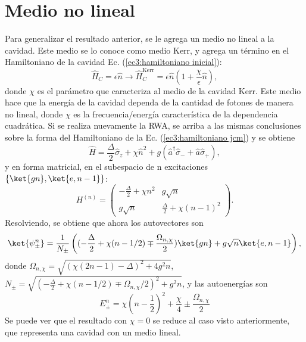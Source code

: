 \section{Medio no lineal}\label{sec3:medio kerr}
Para generalizar el resultado anterior, se le agrega un medio no lineal a la cavidad. Este medio se lo conoce como medio Kerr, y agrega un término en el Hamiltoniano de la cavidad Ec. (\ref{ec3:hamiltoniano inicial}):
\begin{equation}
    \hat H_C=\epsilon \hat n \rightarrow \hat H_C^{\text{Kerr}}=\epsilon \hat n (1+\frac{\chi}{\epsilon}\hat n),
\end{equation}
donde $\chi$ es el parámetro que caracteriza al medio de la cavidad Kerr. Este medio hace que la energía de la cavidad dependa de la cantidad de fotones de manera no lineal, donde $\chi$ es la frecuencia/energía característica de la dependencia cuadrática. Si se realiza nuevamente la RWA, se arriba a las mismas conclusiones sobre la forma del Hamiltoniano de la Ec. (\ref{ec3:hamiltoniano jcm}) y se obtiene
\begin{equation}
    \hat H=\frac{\Delta}{2}\hat \sigma_z+\chi \hat n^2+g(\hat a^\dagger \hat \sigma_-+\hat a \hat \sigma_+),
\end{equation}
y en forma matricial, en el subespacio de n excitaciones $\{\ket{gn},\ket{e,n-1}\}$:
\begin{equation}
    H^{(n)} = \begin{pmatrix}
        -\frac{\Delta}{2}+\chi n^2 & g \sqrt{n} \\
        g \sqrt{n} & \frac{\Delta}{2}+\chi (n-1)^2 
    \end{pmatrix}.
\end{equation}
Resolviendo, se obtiene que ahora los autovectores son
\begin{equation}\label{ec3:autoestado kerr}
    \ket{\psi_\pm^n}=\frac{1}{N_\pm} \left( (-\frac{\Delta}{2}+\chi(n-1/2)\mp\frac{\Omega_{n,\chi}}{2}) \ket{gn} + g\sqrt{n} \ket{e,n-1}  \right),
\end{equation}
donde $\Omega_{n,\chi}=\sqrt{(\chi(2n-1)-\Delta)^2+4g^2n}$, $N_\pm=\sqrt{(-\frac{\Delta}{2}+\chi(n-1/2)\mp\Omega_{n,\chi}/2)^2+g^2n}$, y las autoenergías son 
\begin{equation}\label{ec3:autoenergia kerr}
    E_\pm^n=\chi(n-\frac{1}{2})^2 +\frac{\chi}{4} \pm \frac{\Omega_{n,\chi}}{2}
\end{equation}
Se puede ver que el resultado con $\chi=0$ se reduce al caso visto anteriormente, que representa una cavidad con un medio lineal.

